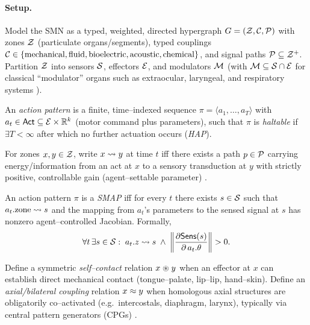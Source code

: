 \paragraph{Setup.}
Model the SMN as a typed, weighted, directed hypergraph
$G = (\mathcal{Z},\mathcal{C},\mathcal{P})$ with zones $\mathcal{Z}$
(particulate organs/segments), typed couplings $\mathcal{C} \in \{\text{mechanical},\text{fluid},\text{bioelectric},\text{acoustic},\text{chemical}\}$, and signal paths $\mathcal{P} \subseteq \mathcal{Z}^{+}$.
Partition $\mathcal{Z}$ into sensors $\mathcal{S}$, effectors $\mathcal{E}$, and modulators $\mathcal{M}$ (with $\mathcal{M} \subseteq \mathcal{S} \cap \mathcal{E}$ for classical “modulator” organs such as extraocular, laryngeal, and respiratory systems \citep{Kelso1995DynamicPatterns,FeldmanDelNegro2006RespiratoryRhythm,Guenther2016NeuralControlSpeech}).

\begin{definition}
An \emph{action pattern} is a finite, time–indexed sequence
$\pi = \langle a_1,\dots,a_T\rangle$ with $a_t \in \mathsf{Act} \subseteq \mathcal{E} \times \mathbb{R}^k$ (motor command plus parameters), such that $\pi$ is \emph{haltable} if $\exists T < \infty$ after which no further actuation occurs (\emph{HAP}).
\end{definition}

\begin{definition}
For zones $x,y \in \mathcal{Z}$, write $x \leadsto y$ at time $t$ iff there exists a path $p \in \mathcal{P}$ carrying energy/information from an act at $x$ to a sensory transduction at $y$ with strictly positive, controllable gain (agent–settable parameter) \citep{TodorovJordan2002OFC,MiallWolpert1996ForwardModels}.
\end{definition}

\begin{definition}[SMAP]
An action pattern $\pi$ is a \emph{SMAP} iff for every $t$ there exists $s\in \mathcal{S}$ such that
$a_t.\text{zone} \leadsto s$ and the mapping from $a_t$'s parameters to the sensed signal at $s$ has nonzero agent–controlled Jacobian. Formally,
\[
\forall t\,\exists s\in \Sensors:\; a_t.z \modrel s \;\wedge\;
\left\|\frac{\partial \Sens(s)}{\partial\, a_t.\theta}\right\|>0.
\]
\end{definition}

\begin{definition}
Define a symmetric \emph{self–contact} relation $x \mathrel{\circledast} y$ when an effector at $x$ can establish direct mechanical contact (tongue–palate, lip–lip, hand–skin). Define an \emph{axial/bilateral coupling} relation $x \mathrel{\approx} y$ when homologous axial structures are obligatorily co–activated (e.g.\ intercostals, diaphragm, larynx), typically via central pattern generators (CPGs) \citep{FeldmanDelNegro2006RespiratoryRhythm,DelNegro2018BreathingMatters,Sherrington1906Integrative}.
\end{definition}

